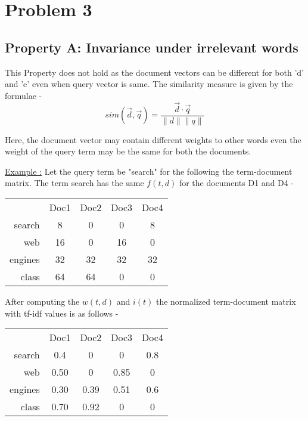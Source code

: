 \documentclass{article}
\begin{document}
\section[C]{Problem 3}
\subsection{\textbf{Property A: Invariance under irrelevant words}}
This Property does not hold as the document vectors can be different for both 'd' and 'e' even when query vector is same. The similarity measure is given by the formulae - 
\[ sim(\vec{d},\vec{q}) = \frac{\vec{d}\cdot\vec{q}}{\| d \| \| q \|}\]

Here, the document vector may contain different weights to other words even the weight of the query term may be the same for both the documents.

\underline{Example :}
Let the query term be "search" for the following the term-document matrix. The term search has the same $f(t,d)$ for the documents D1 and D4 - 

\begin{tabular}{ r|c|c|c|c| }
\multicolumn{1}{r}{}
 & \multicolumn{1}{c}{Doc1}
 & \multicolumn{1}{c}{Doc2}
 & \multicolumn{1}{c}{Doc3}
 & \multicolumn{1}{c}{Doc4} \\
\cline{2-5}
search & 8 & 0 & 0 & 8 \\
\cline{2-5}
web & 16 & 0 & 16 & 0 \\
\cline{2-5}
engines & 32 & 32 & 32 & 32 \\
\cline{2-5}
class & 64 & 64 & 0 & 0 \\
\cline{2-5}
\end{tabular}

After computing the $w(t,d)$ and $i(t)$ the normalized term-document matrix with tf-idf values is as follows - 

\begin{tabular}{ r|c|c|c|c| }
\multicolumn{1}{r}{}
 & \multicolumn{1}{c}{Doc1}
 & \multicolumn{1}{c}{Doc2}
 & \multicolumn{1}{c}{Doc3}
 & \multicolumn{1}{c}{Doc4} \\
\cline{2-5}
search & 0.4 & 0 & 0 & 0.8 \\
\cline{2-5}
web & 0.50 & 0 & 0.85 & 0 \\
\cline{2-5}
engines & 0.30 & 0.39 & 0.51 & 0.6 \\
\cline{2-5}
class & 0.70 & 0.92 & 0 & 0 \\
\cline{2-5}
\end{tabular}
\end{document}
